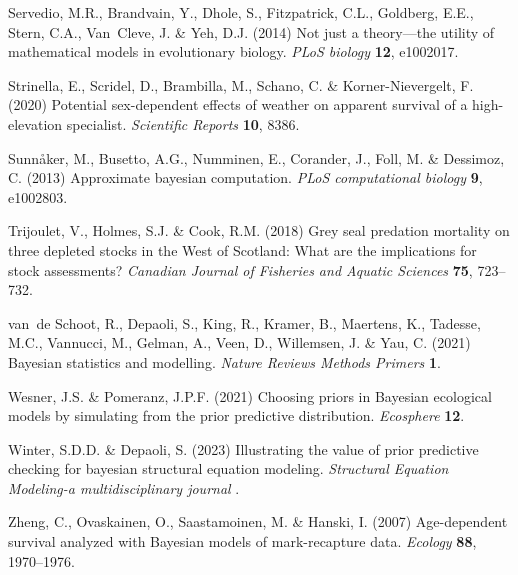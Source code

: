 \documentclass[11pt]{article}
\begin{document}
\begin{thebibliography}{35}
Servedio, M.R., Brandvain, Y., Dhole, S., Fitzpatrick, C.L., Goldberg, E.E.,
  Stern, C.A., Van~Cleve, J. \& Yeh, D.J. (2014) Not just a theory---the
  utility of mathematical models in evolutionary biology. \emph{PLoS biology}
  \textbf{12}, e1002017.

Strinella, E., Scridel, D., Brambilla, M., Schano, C. \& Korner-Nievergelt, F.
  (2020) Potential sex-dependent effects of weather on apparent survival of a
  high-elevation specialist. \emph{Scientific Reports} \textbf{10}, 8386.

Sunn{\aa}ker, M., Busetto, A.G., Numminen, E., Corander, J., Foll, M. \&
  Dessimoz, C. (2013) Approximate bayesian computation. \emph{PLoS
  computational biology} \textbf{9}, e1002803.

Trijoulet, V., Holmes, S.J. \& Cook, R.M. (2018) {Grey seal predation mortality
  on three depleted stocks in the West of Scotland: What are the implications
  for stock assessments?} \emph{Canadian Journal of Fisheries and Aquatic
  Sciences} \textbf{75}, 723--732.

van~de Schoot, R., Depaoli, S., King, R., Kramer, B., Maertens, K., Tadesse,
  M.C., Vannucci, M., Gelman, A., Veen, D., Willemsen, J. \& Yau, C. (2021)
  Bayesian statistics and modelling. \emph{Nature Reviews Methods Primers}
  \textbf{1}.

Wesner, J.S. \& Pomeranz, J.P.F. (2021) {Choosing priors in Bayesian ecological
  models by simulating from the prior predictive distribution}.
  \emph{Ecosphere} \textbf{12}.

Winter, S.D.D. \& Depaoli, S. (2023) Illustrating the value of prior predictive
  checking for bayesian structural equation modeling. \emph{Structural Equation
  Modeling-a multidisciplinary journal} .

Zheng, C., Ovaskainen, O., Saastamoinen, M. \& Hanski, I. (2007) {Age-dependent
  survival analyzed with Bayesian models of mark-recapture data}.
  \emph{Ecology} \textbf{88}, 1970--1976.

\end{thebibliography}
\end{document}
